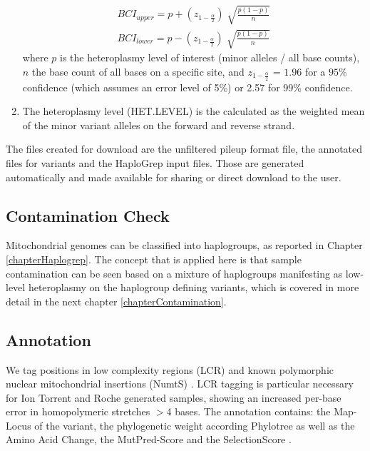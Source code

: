 \begin{enumerate}
\begin{equation}
\begin{split}
  BCI_{upper} = p + \left(z_{1- \frac{\alpha}{2}} \right)\sqrt[]{\frac{p (1-p)}{n} } \\ 
  BCI_{lower} = p - \left(z_{1- \frac{\alpha}{2}} \right)\sqrt[]{\frac{p (1-p)}{n} } 
\end{split}
\end{equation}
where $p$ is the heteroplasmy level of interest (minor alleles / all base counts), $n$ the base count of all bases on a specific site, and  $z_{1- \frac{\alpha}{2}}$ = $1.96$ for a $95\%$ confidence (which assumes an error level of 5\%) or 2.57 for 99\% confidence.
\item The heteroplasmy level (HET.LEVEL) is the calculated as the weighted mean of the minor variant alleles on the forward and reverse strand. 
\end{enumerate}
The files created for download are the unfiltered pileup format file, the annotated files for variants and the HaploGrep input files. Those are generated automatically and made available for sharing or direct download to the user.
\subsection{Contamination Check}
Mitochondrial genomes can be classified into haplogroups, as reported in Chapter \ref{chapterHaplogrep}. The concept that is applied here is that sample contamination can be seen based on a mixture of haplogroups manifesting as low-level heteroplasmy on the haplogroup defining variants, which is covered in more detail in the next chapter \ref{chapterContamination}. 
\subsection{Annotation}\label{subs:annotation}
We tag positions in low complexity regions (LCR) \cite{Zhidkov2011} and known polymorphic nuclear mitochondrial insertions (NumtS) \cite{Dayama2014}. LCR tagging is particular necessary for Ion Torrent and Roche generated samples, showing an increased per-base error in homopolymeric stretches $>$4 bases.  The annotation contains: the Map-Locus of the variant, the phylogenetic weight according Phylotree \cite{VanOven2009} as well as the Amino Acid Change, the MutPred-Score \cite{Li-mutpred2009} and the SelectionScore \cite{Pereira2011}.
